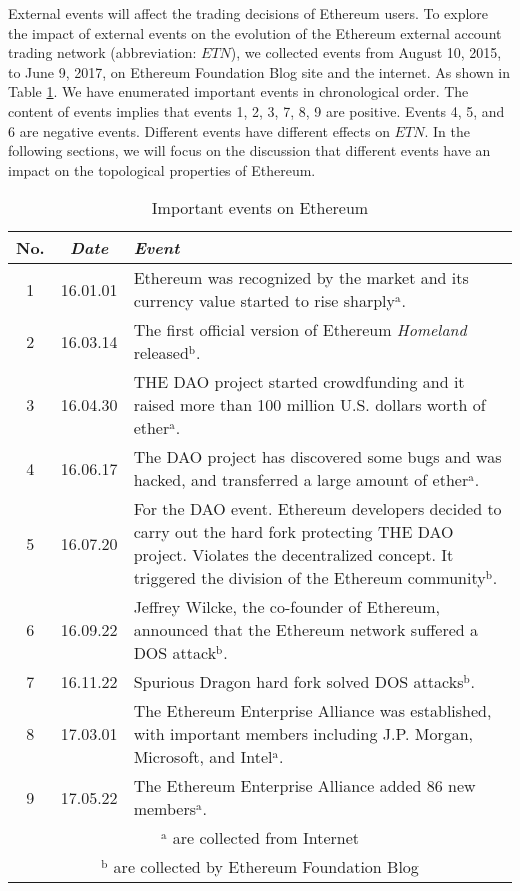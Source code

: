 \documentclass[conference]{IEEEtran}
\begin{document}
\begin{CJK*}{UTF8}{gbsn}
External events will affect the trading decisions of Ethereum users. To explore the impact of external events on the evolution of the Ethereum external account trading network (abbreviation: $ETN$), we collected events from August 10, 2015, to June 9, 2017, on Ethereum Foundation Blog site \cite{b9} and the internet\cite{b9.5}. As shown in Table \ref{tab1}. We have enumerated important events in chronological order. The content of events implies that events 1, 2, 3, 7, 8, 9 are positive. Events 4, 5, and 6 are negative events. Different events have different effects on $ETN$. In the following sections, we will focus on the discussion that different events have an impact on the topological properties of Ethereum.

\begin{table}[htbp]
    \caption{Important events on Ethereum}
    \begin{center}
    \begin{tabular}{ccp{5cm}} \hline
    \textbf{No.} & \textbf{\textit{Date}}& \textbf{\textit{Event}}\\ \hline

1	& 16.01.01 	& Ethereum was recognized by the market and its currency value started to rise sharply$^{\mathrm{a}}. $\\
2	& 16.03.14	& The first official version of Ethereum \textit{Homeland} released$^{\mathrm{b}}$.\\
3	& 16.04.30	& THE DAO project started crowdfunding and it raised more than 100 million U.S. dollars worth of ether$^{\mathrm{a}}$.\\
4	& 16.06.17	& The DAO project has discovered some bugs and was hacked, and transferred a large amount of ether$^{\mathrm{a}}$.\\
5	& 16.07.20	& For the DAO event. Ethereum developers decided to carry out the hard fork protecting THE DAO project. Violates the decentralized concept. It triggered the division of the Ethereum community$^{\mathrm{b}}$. \\
6	& 16.09.22	& Jeffrey Wilcke, the co-founder of Ethereum, announced that the Ethereum network suffered a DOS attack$^{\mathrm{b}}$.\\
7	& 16.11.22	& Spurious Dragon hard fork solved DOS attacks$^{\mathrm{b}}$.\\
8	& 17.03.01 	& The Ethereum Enterprise Alliance was established, with important members including J.P. Morgan, Microsoft, and Intel$^{\mathrm{a}}.$\\
9	& 17.05.22	& The Ethereum Enterprise Alliance added 86 new members$^{\mathrm{a}}$. \\ \hline
   \multicolumn{3}{p{7cm}}{$^{\mathrm{a}}$ are collected from Internet\cite{b9.5}}\\
   \multicolumn{3}{p{7cm}}{$^{\mathrm{b}}$ are collected by Ethereum Foundation Blog\cite{b9}}
    \end{tabular}
    \label{tab1}
    \end{center}
\end{table}


\end{CJK*}
\end{document}
